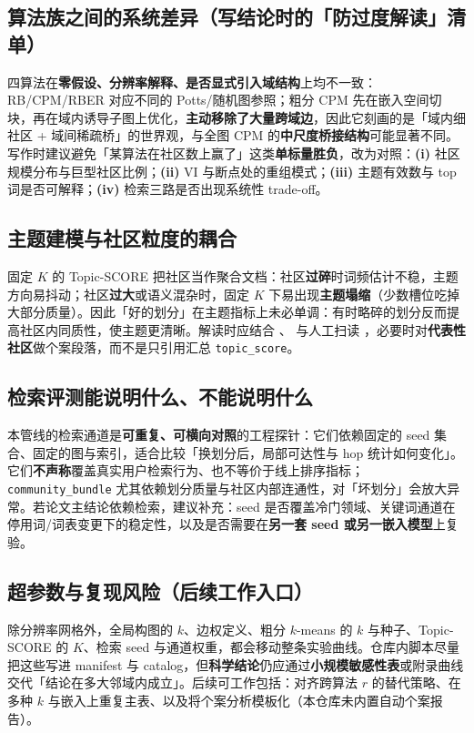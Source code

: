\documentclass[UTF8,a4paper,11pt,fontset=fandol]{ctexart}
\begin{document}
\subsection{算法族之间的系统差异（写结论时的「防过度解读」清单）}
四算法在\textbf{零假设、分辨率解释、是否显式引入域结构}上均不一致：RB/CPM/RBER 对应不同的 Potts/随机图参照；粗分 CPM 先在嵌入空间切块，再在域内诱导子图上优化，\textbf{主动移除了大量跨域边}，因此它刻画的是「域内细社区 + 域间稀疏桥」的世界观，与全图 CPM 的\textbf{中尺度桥接结构}可能显著不同。写作时建议避免「某算法在社区数上赢了」这类\textbf{单标量胜负}，改为对照：\textbf{(i)} 社区规模分布与巨型社区比例；\textbf{(ii)} VI 与断点处的重组模式；\textbf{(iii)} 主题有效数与 top 词是否可解释；\textbf{(iv)} 检索三路是否出现系统性 trade-off。

\subsection{主题建模与社区粒度的耦合}
固定 $K$ 的 Topic-SCORE 把社区当作聚合文档：社区\textbf{过碎}时词频估计不稳，主题方向易抖动；社区\textbf{过大}或语义混杂时，固定 $K$ 下易出现\textbf{主题塌缩}（少数槽位吃掉大部分质量）。因此「好的划分」在主题指标上未必单调：有时略碎的划分反而提高社区内同质性，使主题更清晰。解读时应结合 、 与人工扫读 ，必要时对\textbf{代表性社区}做个案段落，而不是只引用汇总 \texttt{topic\_score}。

\subsection{检索评测能说明什么、不能说明什么}
本管线的检索通道是\textbf{可重复、可横向对照}的工程探针：它们依赖固定的 seed 集合、固定的图与索引，适合比较「换划分后，局部可达性与 hop 统计如何变化」。它们\textbf{不声称}覆盖真实用户检索行为、也不等价于线上排序指标；\texttt{community\_bundle} 尤其依赖划分质量与社区内部连通性，对「坏划分」会放大异常。若论文主结论依赖检索，建议补充：seed 是否覆盖冷门领域、关键词通道在停用词/词表变更下的稳定性，以及是否需要在\textbf{另一套 seed 或另一嵌入模型}上复验。

\subsection{超参数与复现风险（后续工作入口）}
除分辨率网格外，全局构图的 $k$、边权定义、粗分 $k$-means 的 $k$ 与种子、Topic-SCORE 的 $K$、检索 seed 与通道权重，都会移动整条实验曲线。仓库内脚本尽量把这些写进 manifest 与 catalog，但\textbf{科学结论}仍应通过\textbf{小规模敏感性表}或附录曲线交代「结论在多大邻域内成立」。后续可工作包括：对齐跨算法 $r$ 的替代策略、在多种 $k$ 与嵌入上重复主表、以及将个案分析模板化（本仓库未内置自动个案报告）。
\end{document}
